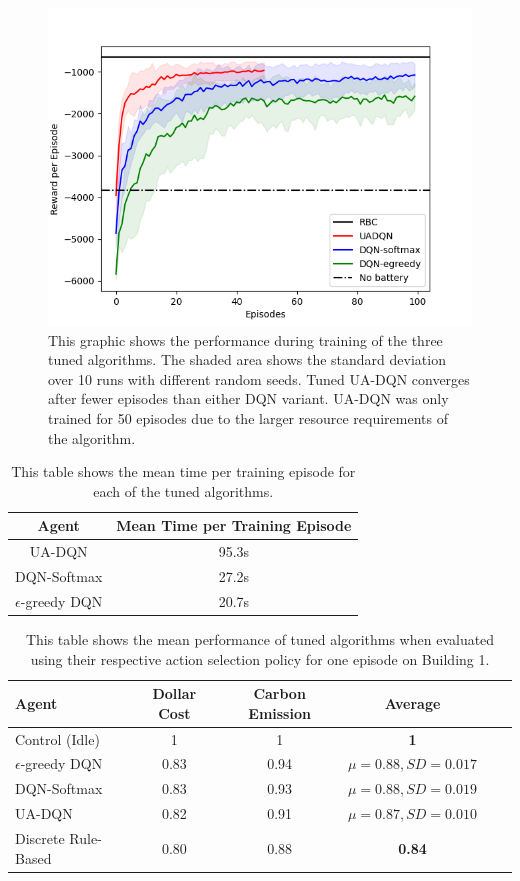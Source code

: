 \begin{figure}
  \centering
  \includegraphics[width=\figurewidth]{figures/tuning_validation.png}
  \caption{This graphic shows the performance during training of the three tuned algorithms. The shaded area shows the standard deviation over 10 runs with different random seeds. Tuned UA-DQN converges after fewer episodes than either DQN variant. UA-DQN was only trained for 50 episodes due to the larger resource requirements of the algorithm.}
  \label{fig:tuning_validation}
\end{figure}

\begin{table}
  \centering
  \caption{This table shows the mean time per training episode for each of the tuned algorithms.}
  \label{tab:resources}
  \begin{tabular}[pos]{c|c}
    Agent & Mean Time per Training Episode \\ \hline           
    UA-DQN   & 95.3s \\
    DQN-Softmax  &27.2s \\
    $\epsilon$-greedy DQN &20.7s \\
  \end{tabular}
\end{table}

\begin{table}
  \centering
  \caption{This table shows the mean performance of tuned algorithms when evaluated using their respective action selection policy for one episode on Building 1.}
  \label{tab:tuned_results}
  \begin{tabular}{l|ccccc}
    Agent                 & Dollar Cost & Carbon Emission & Average \\ \hline
    Control (Idle)   & 1    & 1    & \textbf{1}    \\
    $\epsilon$-greedy DQN & 0.83 & 0.94 & $\mu = \mathbf{0.88}, SD = 0.017$ \\
    DQN-Softmax           & 0.83 & 0.93 & $\mu = \mathbf{0.88}, SD = 0.019$ \\
    UA-DQN                & 0.82 & 0.91 & $\mu = \mathbf{0.87}, SD = 0.010$ \\
    Discrete Rule-Based   & 0.80 & 0.88 & \textbf{0.84}
  \end{tabular}
\end{table}
